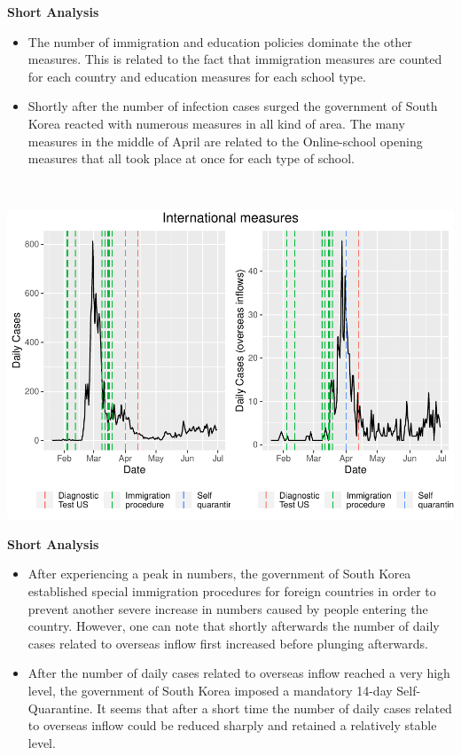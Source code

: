 \documentclass[
]{article}
\providecommand{\tightlist}{%
  \setlength{\itemsep}{0pt}\setlength{\parskip}{0pt}}
\begin{document}
\textbf{Short Analysis}

\begin{itemize}
\item
  The number of immigration and education policies dominate the other
  measures. This is related to the fact that immigration measures are
  counted for each country and education measures for each school type.
\item
  Shortly after the number of infection cases surged the government of
  South Korea reacted with numerous measures in all kind of area. The
  many measures in the middle of April are related to the Online-school
  opening measures that all took place at once for each type of school.
\end{itemize}

~

\includegraphics{Main_Analysis_files/figure-latex/unnamed-chunk-13-1.pdf}

\textbf{Short Analysis}

\begin{itemize}
\tightlist
\item
  After experiencing a peak in numbers, the government of South Korea
  established special immigration procedures for foreign countries in
  order to prevent another severe increase in numbers caused by people
  entering the country. However, one can note that shortly afterwards
  the number of daily cases related to overseas inflow first increased
  before plunging afterwards.
\item
  After the number of daily cases related to overseas inflow reached a
  very high level, the government of South Korea imposed a mandatory
  14-day Self-Quarantine. It seems that after a short time the number of
  daily cases related to overseas inflow could be reduced sharply and
  retained a relatively stable level.
\end{itemize}
\end{document}
